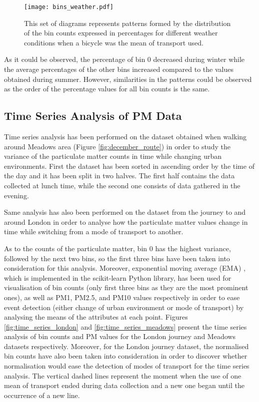 \documentclass[bsc,frontabs,twoside,singlespacing, parskip,deptreport]{infthesis}     %
\begin{document}
\begin{figure}[h!]
  \center
  \texttt{[image: bins\_weather.pdf]} 
  \caption{This set of diagrams represents patterns formed by the distribution of the bin counts expressed in percentages for different weather conditions when a bicycle was the mean of transport used.}
  \label{fig:bins_weather}
\end{figure}

As it could be observed, the percentage of bin 0 decreased during winter while the average percentages of the other bins increased compared to the values obtained during summer. However, similarities in the patterns could be observed as the order of the percentage values for all bin counts is the same.

\subsection{Time Series Analysis of PM Data}

Time series analysis has been performed on the dataset obtained when walking around Meadows area (Figure \ref{fig:december_route}) in order to study the variance of the particulate matter counts in time while changing urban environments. First the dataset has been sorted in ascending order by the time of the day and it has been split in two halves. The first half contains the data collected at lunch time, while the second one consists of data gathered in the evening.

Same analysis has also been performed on the dataset from the journey to and around London in order to analyse how the particulate matter values change in time while switching from a mode of transport to another.

As to the counts of the particulate matter, bin 0 has the highest variance, followed by the next two bins, so the first three bins have been taken into consideration for this analysis. Moreover, exponential moving average (EMA) , which is implemented in the scikit-learn Python library, has been used for visualisation of bin counts (only first three bins as they are the most prominent ones), as well as PM1, PM2.5, and PM10 values respectively in order to ease event detection (either change of urban environment or mode of transport) by analysing the means of the attributes at each point. Figures \ref{fig:time_series_london} and \ref{fig:time_series_meadows} present the time series analysis of bin counts and PM values for the London journey and Meadows datasets respectively. Moreover, for the London journey dataset, the normalised bin counts have also been taken into consideration in order to discover whether normalisation would ease the detection of modes of transport for the time series analysis. The vertical dashed lines represent the moment when the use of one mean of transport ended during data collection and a new one began until the occurrence of a new line.
\end{document}
